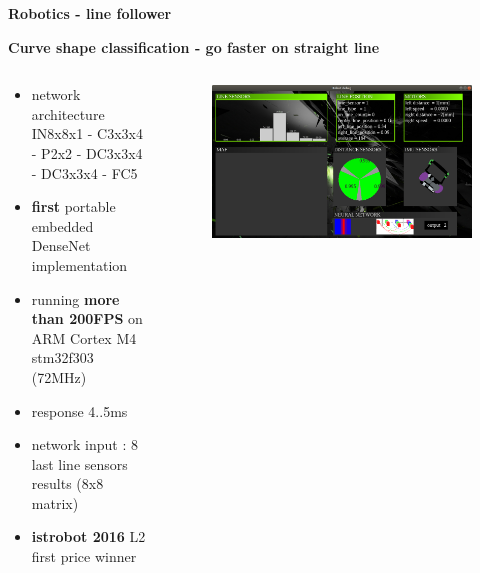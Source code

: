 \documentclass[xcolor=dvipsnames]{beamer}
\begin{document}
\begin{frame}{\bf Robotics - line follower}

{\bf Curve shape classification - go faster on straight line}
\begin{columns}
    \begin{column}{0.5\textwidth}

    \begin{itemize}
      \item network architecture  \\
      {\footnotesize IN8x8x1 - C3x3x4 - P2x2 - DC3x3x4 - DC3x3x4 - FC5}
      \item {\color{red} \bf first} portable embedded DenseNet implementation
      \item running {\color{red} \bf more than 200FPS} on ARM Cortex M4 stm32f303 (72MHz)
      \item response 4..5ms
      \item network input : 8 last line sensors results (8x8 matrix)
      \item {\color{red} \bf istrobot 2016} L2 first price winner
    \end{itemize}


    \end{column}

    \begin{column}{0.5\textwidth}  %

        \begin{figure}
          \includegraphics[scale=0.1]{../../pictures/robot_debug_app.png}
        \end{figure}


\end{column}
\end{columns}
\end{frame}
\end{document}
